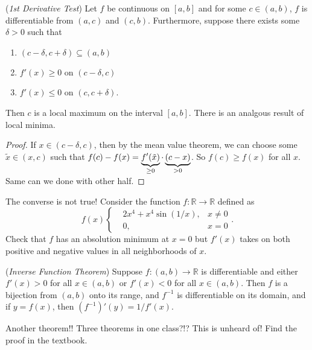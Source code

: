 \documentclass[11pt]{article}
\theoremstyle{definition}
\newcommand{\R}{\mathbb{R}}                      %
\begin{document}
\begin{shaded}
    \theorem (\textit{1st Derivative Test}) Let $f$ be continuous on $[a,b]$ and for some $c\in(a,b)$, $f$ is differentiable from $(a,c)$ and $(c,b)$. Furthermore, suppose there exists some $\delta>0$ such that 
    \begin{enumerate}
        \item $(c-\delta,c+\delta)\subseteq (a,b)$
        \item $f'(x)\geq 0$ on $(c-\delta, c)$
        \item $f'(x)\leq 0$ on $(c,c+\delta)$.
    \end{enumerate}
    Then $c$ is a local maximum on the interval $[a,b]$. There is an analgous result of local minima.
\end{shaded}
\begin{proof}
    If $x\in(c-\delta,c)$, then by the mean value theorem, we can choose some $\tilde{x}\in(x,c)$ such that $f(c)-f(x)=\underbrace{f'(\Tilde{x})}_{\geq 0}\cdot \underbrace{(c-x)}_{>0}$. So $f(c)\geq f(x)$ for all $x$. Same can we done with other half. 
\end{proof}
\note The converse is not true! Consider the function $f:\R\to\R$ defined as
$$
f(x)\left\{\begin{aligned}
    &2x^4+x^4\sin(1/x),& x\neq 0\\
    &0,&x=0
\end{aligned}\right..
$$
Check that $f$ has an absolution minimum at $x=0$ but $f'(x)$ takes on both positive and negative values in all neighborhoods of $x$.

\begin{shaded}
    \theorem (\textit{Inverse Function Theorem}) Suppose $f:(a,b)\to \R$ is differentiable and either $f'(x)>0$ for all $x\in(a,b)$ or $f'(x)<0$ for all $x\in (a,b)$. Then $f$ is a bijection from $(a,b)$ onto its range, and $f^{-1}$ is differentiable on its domain, and if $y=f(x)$, then $(f^{-1})'(y)=1/f'(x)$.
\end{shaded}
Another theorem!! Three theorems in one class?!? This is unheard of! Find the proof in the textbook.
\end{document}
